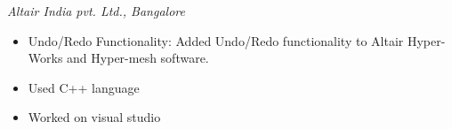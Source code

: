 \documentclass[
	a4paper,
]{fortysecondscv}
\begin{document}







		
    	


\vspace{-1pt}
\begin{cvtable}[0.5]
	{\hspace{-72} \emph{Altair India pvt. Ltd., Bangalore}
	\vspace{-5pt}
	\begin{itemize}[leftmargin=-2cm]
	\item Undo/Redo Functionality: Added Undo/Redo functionality to Altair Hyper-Works and Hyper-mesh software.
	\item Used C++ language  
	\item Worked on visual studio
     \vspace{-5pt}
	\end{itemize}
	}


\end{cvtable}
\vspace{-1pt}
\end{document}

